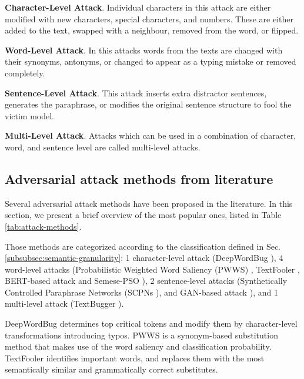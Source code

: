 \textbf{Character-Level Attack}. Individual characters in this attack are either modified with new characters, special characters, and numbers. These are either added to the text, swapped with a neighbour, removed from the word, or flipped.

\textbf{Word-Level Attack}. In this attacks words from the texts are changed with their synonyms, antonyms, or changed to appear as a typing mistake or removed completely.

\textbf{Sentence-Level Attack}. This attack inserts extra distractor sentences, generates the paraphrase, or modifies the original sentence structure to fool the victim model.

\textbf{Multi-Level Attack}. Attacks which can be used in a combination of character, word, and sentence level are called multi-level attacks.

\subsection{Adversarial attack methods from literature}\label{subsec:aam-from-literature}

Several adversarial attack methods have been proposed in the literature. In this section, we present a brief overview of the most popular ones, listed in Table \ref{tab:attack-methods}.

Those methods are categorized according to the classification defined in Sec. \ref{subsubsec:semantic-granularity}:
1 character-level attack (DeepWordBug \cite{journals/corr/abs-1801-04354}), 4 word-level attacks (Probabilistic Weighted Word Saliency (PWWS) \cite{conf/acl/RenDHC19}, TextFooler \cite{journals/corr/abs-1907-11932}, BERT-based attack \cite{conf/emnlp/LiMGXQ20} and Semese-PSO \cite{conf/acl/ZangQYLZLS20}), 2 sentence-level attacks (Synthetically Controlled Paraphrase Networks (SCPNs \cite{conf/naacl/IyyerWGZ18}), and GAN-based attack \cite{journals/corr/abs-1710-11342}), and 1 multi-level attack (TextBugger \cite{conf/ndss/LiJDLW19}).


DeepWordBug determines top critical tokens and modify them by character-level transformations introducing typos. 
PWWS is a synonym-based substitution method that makes use of the word saliency and classification probability.
TextFooler identifies important words, and replaces them with the most semantically similar and grammatically correct substitutes.

